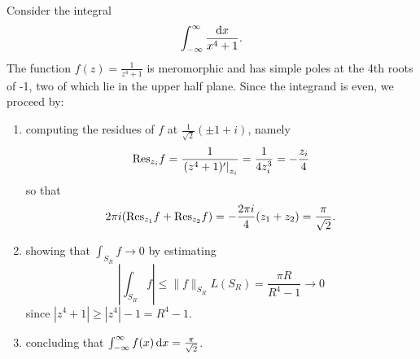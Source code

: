 \begin{xmpl}
  Consider the integral
  $$
  \int_{-\infty}^\infty \frac{\mathop{}\!\mathrm{d} x}{x^4 + 1}.
  $$
  The function $f(z) = \frac{1}{z^4 + 1}$ is meromorphic and has
  simple poles at the 4th roots of -1, two of which lie in the
  upper half plane. Since the integrand is even, we proceed by:
  \begin{enumerate}
    \item{
       computing the residues of $f$ at
       $\frac{1}{\sqrt{2}}(\pm 1 + i)$, namely
       $$
         \mathrm{Res}_{z_i} f
       = \frac{1}{\left.(z^4 + 1)^\prime\right|_{z_i}}
       = \frac{1}{4z_i^3}
       = -\frac{z_i}{4}
       $$
       so that
       $$
         2 \pi i (\mathrm{Res}_{z_1} f + \mathrm{Res}_{z_2} f)
       = -\frac{2\pi i}{4}(z_1 + z_2) = \frac{\pi}{\sqrt{2}}.
       $$
     }
     \item{
       showing that $\int_{S_R} f \to 0$ by estimating
       $$
            \left|
              \int_{S_R} f
            \right|
       \leq \| f \|_{S_R} L(S_R)
       =    \frac{\pi R}{R^4 - 1} \to 0
       $$
       since $|z^4 + 1| \geq |z^4| - 1 = R^4 - 1$.
     }
     \item{
       concluding that
       $\int_{-\infty}^\infty f(x) \mathop{}\!\mathrm{d} x = \frac{\pi}{\sqrt{2}}$.
     }
  \end{enumerate}
\end{xmpl}

